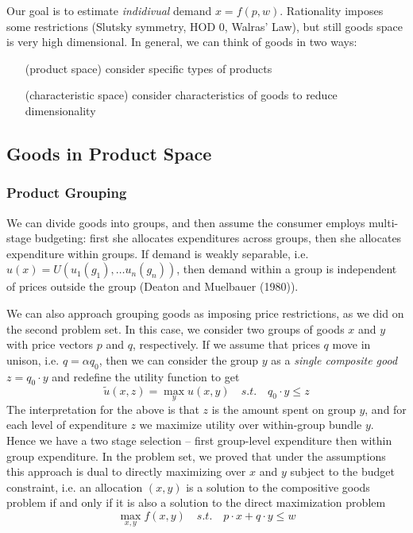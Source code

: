 

Our goal is to estimate \textit{indidivual} demand $x =
f(p,w)$. Rationality imposes some restrictions (Slutsky symmetry, HOD
0, Walras' Law), but still goods space is very high dimensional. In
general, we can think of goods in two ways:

\begin{itemize}
\item[(product space)] consider specific types of products
\item[(characteristic space)] consider characteristics of goods to
  reduce dimensionality
\end{itemize}

\subsection{Goods in Product Space}
\label{sec:goods-product-space}

\subsubsection{Product Grouping}
\label{sec:product-grouping}

We can divide goods into groups, and then assume the consumer employs
multi-stage budgeting: first she allocates expenditures across groups,
then she allocates expenditure within groups. If demand is weakly
separable, i.e. $u(x) = U(u_1(g_1), \dots u_n(g_n))$, then demand
within a group is independent of prices outside the group (Deaton and
Muelbauer (1980)).

We can also approach grouping goods as imposing price restrictions, as
we did on the second problem set. In this case, we consider two groups
of goods $x$ and $y$ with price vectors $p$ and $q$, respectively. If
we assume that prices $q$ move in unison, i.e. $q = \alpha q_0$, then
we can consider the group $y$ as a \textit{single composite good} $z =
q_0 \cdot y$ and redefine the utility function to get
\[
\tilde u(x, z) = \max_y u(x,y) \quad s.t. \quad q_0 \cdot y \leq z
\]
The interpretation for the above is that $z$ is the amount spent on
group $y$, and for each level of expenditure $z$ we maximize utility
over within-group bundle $y$. Hence we have a two stage selection --
first group-level expenditure then within group expenditure. In the
problem set, we proved that under the assumptions this approach is
dual to directly maximizing over $x$ and $y$ subject to the budget
constraint, i.e. an allocation $(x,y)$ is a solution to the
compositive goods problem if and only if it is also a solution to the
direct maximization problem 
\[
\max_{x,y} f(x,y) \quad s.t. \quad p \cdot x + q \cdot y \leq w
\]

